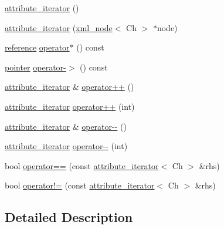 \begin{DoxyCompactItemize}
\item 
\mbox{\hyperlink{classrapidxml_1_1attribute__iterator_a30a82132793bc59d4e7b20f5be6237b9}{attribute\+\_\+iterator}} ()
\item 
\mbox{\hyperlink{classrapidxml_1_1attribute__iterator_a1109344dead88533ae4dd68cea5d9613}{attribute\+\_\+iterator}} (\mbox{\hyperlink{classrapidxml_1_1xml__node}{xml\+\_\+node}}$<$ Ch $>$ $\ast$node)
\item 
\mbox{\hyperlink{classrapidxml_1_1attribute__iterator_a097343e44557de14de86b470d3f917d9}{reference}} \mbox{\hyperlink{classrapidxml_1_1attribute__iterator_aa15f5f06d2a6199467a33aa19f4357aa}{operator$\ast$}} () const
\item 
\mbox{\hyperlink{classrapidxml_1_1attribute__iterator_a69acc2e60270d6a062c03c9cb1cf2aa7}{pointer}} \mbox{\hyperlink{classrapidxml_1_1attribute__iterator_a499c7ed0e1835f029585d0a9ba25f446}{operator-\/$>$}} () const
\item 
\mbox{\hyperlink{classrapidxml_1_1attribute__iterator}{attribute\+\_\+iterator}} \& \mbox{\hyperlink{classrapidxml_1_1attribute__iterator_afe7d15a4a1b228f97f1d4ebd4f3f6cca}{operator++}} ()
\item 
\mbox{\hyperlink{classrapidxml_1_1attribute__iterator}{attribute\+\_\+iterator}} \mbox{\hyperlink{classrapidxml_1_1attribute__iterator_a82c8859b9eebd45caa3afc25b9e78c36}{operator++}} (int)
\item 
\mbox{\hyperlink{classrapidxml_1_1attribute__iterator}{attribute\+\_\+iterator}} \& \mbox{\hyperlink{classrapidxml_1_1attribute__iterator_af22f1ad3c11d3269b43b49e29b89d7d1}{operator-\/-\/}} ()
\item 
\mbox{\hyperlink{classrapidxml_1_1attribute__iterator}{attribute\+\_\+iterator}} \mbox{\hyperlink{classrapidxml_1_1attribute__iterator_af52a8562ab1b2c0391cdde79f55e4a6f}{operator-\/-\/}} (int)
\item 
bool \mbox{\hyperlink{classrapidxml_1_1attribute__iterator_ab1dc8dd11d21e145a4e3f76d46aead0d}{operator==}} (const \mbox{\hyperlink{classrapidxml_1_1attribute__iterator}{attribute\+\_\+iterator}}$<$ Ch $>$ \&rhs)
\item 
bool \mbox{\hyperlink{classrapidxml_1_1attribute__iterator_a39e8cf336c324521fd9c720abf280d88}{operator!=}} (const \mbox{\hyperlink{classrapidxml_1_1attribute__iterator}{attribute\+\_\+iterator}}$<$ Ch $>$ \&rhs)
\end{DoxyCompactItemize}


\subsection{Detailed Description}
